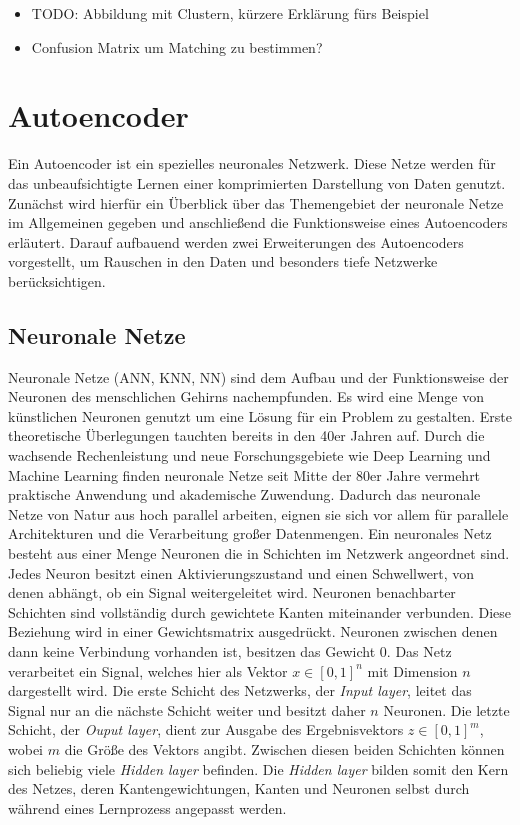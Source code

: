 \begin{itemize}
	\item TODO: Abbildung mit Clustern, kürzere Erklärung fürs Beispiel
	\item Confusion Matrix um Matching zu bestimmen? 
\end{itemize}

\section{Autoencoder}

Ein Autoencoder ist ein spezielles neuronales Netzwerk. Diese Netze werden für das unbeaufsichtigte Lernen einer komprimierten Darstellung von Daten genutzt. Zunächst wird hierfür ein Überblick über das Themengebiet der neuronale Netze im Allgemeinen gegeben und anschließend die Funktionsweise eines Autoencoders erläutert. Darauf aufbauend werden zwei Erweiterungen des Autoencoders vorgestellt, um Rauschen in den Daten und besonders tiefe Netzwerke berücksichtigen.

\subsection{Neuronale Netze}

Neuronale Netze (ANN, KNN, NN) sind dem Aufbau und der Funktionsweise der Neuronen des menschlichen Gehirns nachempfunden. Es wird eine Menge von künstlichen Neuronen genutzt um eine Lösung für ein Problem zu gestalten. Erste theoretische Überlegungen tauchten bereits in den 40er Jahren auf. Durch die wachsende Rechenleistung und neue Forschungsgebiete wie Deep Learning und Machine Learning finden neuronale Netze seit Mitte der 80er Jahre vermehrt praktische Anwendung und akademische Zuwendung. Dadurch das neuronale Netze von Natur aus hoch parallel arbeiten, eignen sie sich vor allem für parallele Architekturen und die Verarbeitung großer Datenmengen. 
Ein neuronales Netz besteht aus einer Menge Neuronen die in Schichten im Netzwerk angeordnet sind. Jedes Neuron besitzt einen Aktivierungszustand und einen Schwellwert, von denen abhängt, ob ein Signal weitergeleitet wird. Neuronen benachbarter Schichten sind vollständig durch gewichtete Kanten miteinander verbunden. Diese Beziehung wird in einer Gewichtsmatrix ausgedrückt. Neuronen zwischen denen dann keine Verbindung vorhanden ist, besitzen das Gewicht 0. 
Das Netz verarbeitet ein Signal, welches hier als Vektor $x \in [0,1]^n$ mit Dimension $n$ dargestellt wird. Die erste Schicht des Netzwerks, der \textit{Input layer}, leitet das Signal nur an die nächste Schicht weiter und besitzt daher $n$ Neuronen. Die letzte Schicht, der \textit{Ouput layer}, dient zur Ausgabe des Ergebnisvektors $z \in [0,1]^m$, wobei $m$ die Größe des Vektors angibt. Zwischen diesen beiden Schichten können sich beliebig viele \textit{Hidden layer} befinden. Die \textit{Hidden layer} bilden somit den Kern des Netzes, deren Kantengewichtungen, Kanten und Neuronen selbst durch während eines Lernprozess angepasst werden.


